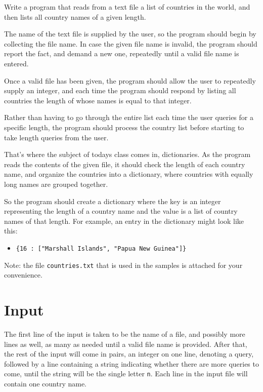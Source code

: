 
Write a program that reads from a text file
a list of countries in the world,
and then lists all country names of a given length.

The name of the text file is supplied by the user,
so the program should begin by collecting the file name.
In case the given file name is invalid,
the program should report the fact, and demand a new one,
repeatedly until a valid file name is entered.

Once a valid file has been given,
the program should allow the user to repeatedly supply an integer,
and each time the program should respond by listing all countries
the length of whose names is equal to that integer.

Rather than having to go through the entire list
each time the user queries for a specific length,
the program should process the country list
before starting to take length queries from the user.

That's where the subject of todays class comes in, dictionaries.
As the program reads the contents of the given file,
it should check the length of each country name,
and organize the countries into a dictionary,
where countries with equally long names are grouped together.

So the program should create a dictionary where the key is an integer
representing the length of a country name
and the value is a list of country names of that length.
For example, an entry in the dictionary might look like this:
\begin{itemize}
    \item
    \texttt{\{16 : ["Marshall Islands", "Papua New Guinea"]\}}
\end{itemize}

Note: the file \texttt{countries.txt} that is used in the samples
is attached for your convenience.


\section*{Input}

The first line of the input is taken to be the name of a file,
and possibly more lines as well,
as many as needed until a valid file name is provided.
After that, the rest of the input will come in pairs,
an integer on one line, denoting a query,
followed by a line containing a string
indicating whether there are more queries to come,
until the string will be the single letter \texttt{n}.
Each line in the input file will contain one country name.

